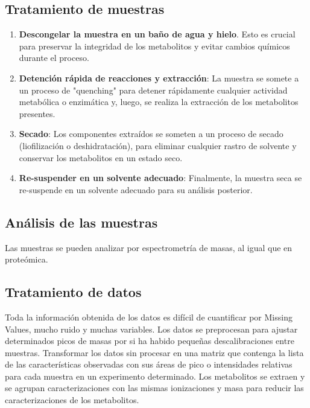 \subsection{Tratamiento de muestras}
\begin{enumerate}
\item  \textbf{Descongelar la muestra en un baño de agua y hielo}. Esto es crucial para preservar la integridad de los metabolitos y evitar cambios químicos durante el proceso.
\item \textbf{Detención rápida de reacciones y extracción}: La muestra se somete a un proceso de "quenching" para detener rápidamente cualquier actividad metabólica o enzimática y, luego, se realiza la extracción de los metabolitos presentes.
\item \textbf{Secado}: Los componentes extraídos se someten a un proceso de secado (liofilización o deshidratación), para eliminar cualquier rastro de solvente y conservar los metabolitos en un estado seco.
\item \textbf{Re-suspender en un solvente adecuado}: Finalmente, la muestra seca se re-suspende en un solvente adecuado para su análisis posterior.
\end{enumerate}

\subsection{Análisis de las muestras}
Las muestras se pueden analizar por espectrometría de masas, al igual que en proteómica. 

\subsection{Tratamiento de datos}
Toda la información obtenida de los datos es difícil de cuantificar por Missing Values, mucho ruido y muchas variables. Los datos se preprocesan para ajustar determinados picos de masas por si ha habido pequeñas descalibraciones entre muestras.
Transformar los datos sin procesar en una matriz que contenga la lista de las características observadas con sus áreas de pico o intensidades relativas para cada muestra en un experimento determinado.
Los metabolitos se extraen y se agrupan caracterizaciones con las mismas ionizaciones y masa para reducir las caracterizaciones de los metabolitos.

